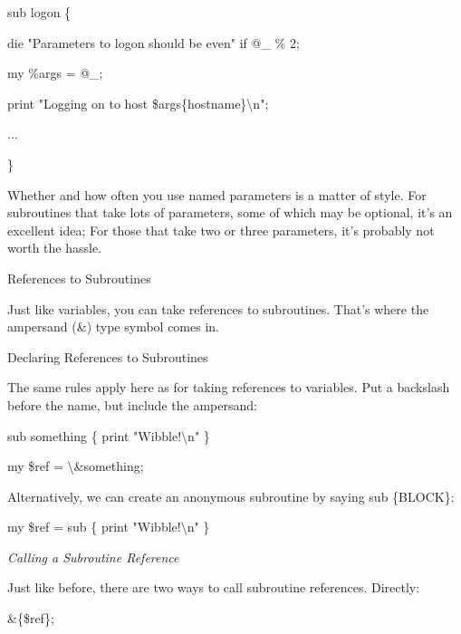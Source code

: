 \documentclass[a4paper,11pt]{book}
\begin{document}
\noindent 

\noindent sub logon \{

\noindent die "Parameters to logon should be even" if @\_  \% 2;

\noindent my \%args = @\_;

\noindent print "Logging on to host \$args\{hostname\}\textbackslash n";

\noindent ...

\noindent \}

\noindent 

\noindent Whether and how often you use named parameters is a matter of style. For subroutines that take lots of parameters, some of which may be optional, it's an excellent idea; For those that take two or three parameters, it's probably not worth the hassle.

\noindent 

\noindent 

\noindent References to Subroutines

\noindent 

\noindent Just like variables, you can take references to subroutines. That's where the ampersand (\&) type symbol comes in.

\noindent 

\noindent Declaring References to Subroutines

\noindent The same rules apply here as for taking references to variables. Put a backslash before the name, but include the ampersand:

\noindent 

\noindent sub something \{ print "Wibble!\textbackslash n" \}

\noindent 

\noindent my \$ref = \textbackslash \&something;

\noindent 

\noindent Alternatively, we can create an anonymous subroutine by saying sub \{BLOCK\}:

\noindent 

\noindent my \$ref = sub \{ print "Wibble!\textbackslash n" \}

\noindent 

\noindent \textit{Calling a Subroutine Reference}

\noindent Just like before, there are two ways to call subroutine references. Directly:

\noindent 

\noindent \&\{\$ref\};
\end{document}
